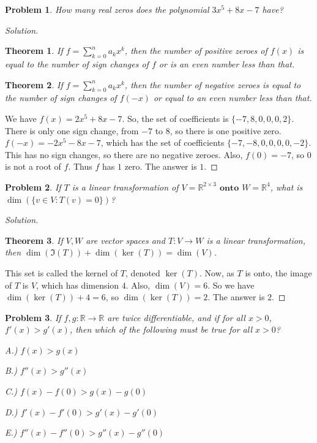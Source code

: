\documentclass[oneside]{book}
\theoremstyle{mystyle}
\newtheorem{problem}{Problem}[section]
\newtheorem*{theorem*}{Theorem}
\begin{document}
\begin{problem}
How many real zeros does the polynomial $3x^5+8x-7$ have?
\end{problem}
\begin{proof}[Solution]
\begin{theorem*}
If $f = \sum_{k=0}^{n} a_k x^k$, then the number of positive zeroes of $f(x)$ is equal to the number of sign changes of $f$ or is an even number less than that.
\end{theorem*}
\begin{theorem*}
If $f=\sum_{k=0}^{n} a_k x^k$, then the number of negative zeroes is equal to the number of sign changes of $f(-x)$ or equal to an even number less than that.
\end{theorem*}
We have $f(x) = 2x^5+8x - 7$. So, the set of coefficients is $\{-7,8,0,0,0,2\}$. There is only one sign change, from $-7$ to $8$, so there is one positive zero. $f(-x) = -2x^5 - 8x - 7$, which has the set of coefficients $\{-7,-8,0,0,0,0,-2\}$. This has no sign changes, so there are no negative zeroes. Also, $f(0) = -7$, so $0$ is not a root of $f$. Thus $f$ has $1$ zero. The answer is $1$.
\end{proof}
\begin{problem}
If $T$ is a linear transformation of $V = \mathbb{R}^{2\times 3}$ $\textbf{onto}$ $W = \mathbb{R}^4$, what is $\dim(\{v\in V:T(v) = 0\})$?
\end{problem}
\begin{proof}[Solution]
\begin{theorem*}
If $V,W$ are vector spaces and $T:V\rightarrow W$ is a linear transformation, then $\dim(\Im(T)) + \dim(\ker(T)) = \dim(V)$.
\end{theorem*}
This set is called the kernel of $T$, denoted $\ker(T)$. Now, as $T$ is onto, the image of $T$ is $V$, which has dimension $4$. Also, $\dim(V) = 6$. So we have $\dim(\ker(T)) + 4 = 6$, so $\dim(\ker(T)) = 2$. The answer is $2$.
\end{proof}
\begin{problem}
If $f,g:\mathbb{R}\rightarrow \mathbb{R}$ are twice differentiable, and if for all $x>0$, $f'(x)>g'(x)$, then which of the following must be true for all $x>0$?
\begin{enumerate}
    \begin{multicols}{3}
    \item[A.)] $f(x)>g(x)$
    \item[B.)] $f''(x)>g''(x)$
    \item[C.)] $f(x)-f(0)>g(x)-g(0)$
    \item[D.)] $f'(x)-f'(0)>g'(x)-g'(0)$
    \item[E.)] $f''(x) - f''(0)>g''(x)-g''(0)$
    \end{multicols}
\end{enumerate}
\end{problem}
\end{document}
